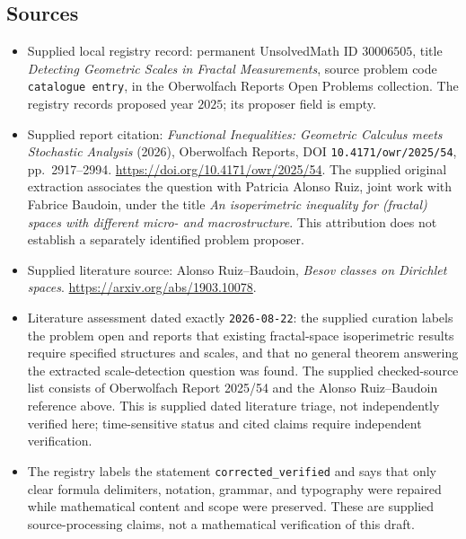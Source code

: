 \documentclass[11pt]{article}
\begin{document}
\subsection{Sources}
\begin{itemize}
\item Supplied local registry record: permanent UnsolvedMath ID \(30006505\), title \emph{Detecting Geometric Scales in Fractal Measurements}, source problem code \texttt{catalogue entry}, in the Oberwolfach Reports Open Problems collection. The registry records proposed year \(2025\); its proposer field is empty.
\item Supplied report citation: \emph{Functional Inequalities: Geometric Calculus meets Stochastic Analysis} (2026), Oberwolfach Reports, DOI \texttt{10.4171/owr/2025/54}, pp.\ 2917--2994. \url{https://doi.org/10.4171/owr/2025/54}. The supplied original extraction associates the question with Patricia Alonso Ruiz, joint work with Fabrice Baudoin, under the title \emph{An isoperimetric inequality for (fractal) spaces with different micro- and macrostructure}. This attribution does not establish a separately identified problem proposer.
\item Supplied literature source: Alonso Ruiz--Baudoin, \emph{Besov classes on Dirichlet spaces}. \url{https://arxiv.org/abs/1903.10078}.
\item Literature assessment dated exactly \texttt{2026-08-22}: the supplied curation labels the problem open and reports that existing fractal-space isoperimetric results require specified structures and scales, and that no general theorem answering the extracted scale-detection question was found. The supplied checked-source list consists of Oberwolfach Report 2025/54 and the Alonso Ruiz--Baudoin reference above. This is supplied dated literature triage, not independently verified here; time-sensitive status and cited claims require independent verification.
\item The registry labels the statement \texttt{corrected\_verified} and says that only clear formula delimiters, notation, grammar, and typography were repaired while mathematical content and scope were preserved. These are supplied source-processing claims, not a mathematical verification of this draft.
\end{itemize}
\end{document}
